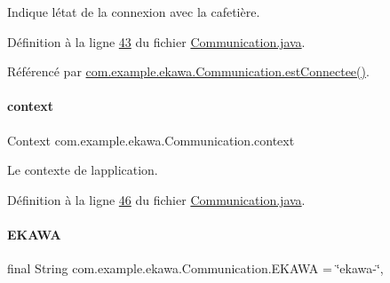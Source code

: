 Indique l\textquotesingle{}état de la connexion avec la cafetière. 



Définition à la ligne \hyperlink{_communication_8java_source_l00043}{43} du fichier \hyperlink{_communication_8java_source}{Communication.\+java}.



Référencé par \hyperlink{_communication_8java_source_l00260}{com.\+example.\+ekawa.\+Communication.\+est\+Connectee()}.

\mbox{\label{classcom_1_1example_1_1ekawa_1_1_communication_aa5ae3c4eaab6ec31d3b358431e812d00}} 
\paragraph{\texorpdfstring{context}{context}}
{\footnotesize\ttfamily Context com.\+example.\+ekawa.\+Communication.\+context\hspace{0.3cm}{\ttfamily [private]}}



Le contexte de l\textquotesingle{}application. 



Définition à la ligne \hyperlink{_communication_8java_source_l00046}{46} du fichier \hyperlink{_communication_8java_source}{Communication.\+java}.

\mbox{\label{classcom_1_1example_1_1ekawa_1_1_communication_a85da929bac3fd83864a79ed4c3a57044}} 
\paragraph{\texorpdfstring{E\+K\+A\+WA}{EKAWA}}
{\footnotesize\ttfamily final String com.\+example.\+ekawa.\+Communication.\+E\+K\+A\+WA = \char`\"{}ekawa-\/\char`\"{}\hspace{0.3cm}{\ttfamily [static]}, {\ttfamily [private]}}



